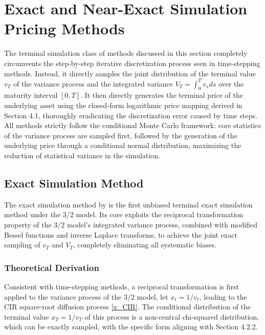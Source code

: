 \section{Exact and Near-Exact Simulation Pricing Methods}
The terminal simulation class of methods discussed in this section completely circumvents the step-by-step iterative discretization process seen in time-stepping methods. Instead, it directly samples the joint distribution of the terminal value $v_T$ of the variance process and the integrated variance $V_T = \int_0^T v_s ds$ over the maturity interval $[0,T]$. It then directly generates the terminal price of the underlying asset using the closed-form logarithmic price mapping derived in Section 4.1, thoroughly eradicating the discretization error caused by time steps. All methods strictly follow the conditional Monte Carlo framework: core statistics of the variance process are sampled first, followed by the generation of the underlying price through a conditional normal distribution, maximizing the reduction of statistical variance in the simulation.

\subsection{Exact Simulation Method}

The exact simulation method by \citet{baldeauxEXACTSIMULATION322012} is the first unbiased terminal exact simulation method under the $3/2$ model. Its core exploits the reciprocal transformation property of the $3/2$ model's integrated variance process, combined with modified Bessel functions and inverse Laplace transforms, to achieve the joint exact sampling of $v_T$ and $V_T$, completely eliminating all systematic biases.

\subsubsection{Theoretical Derivation}
Consistent with time-stepping methods, a reciprocal transformation is first applied to the variance process of the $3/2$ model, let $x_t = 1/v_t$, leading to the CIR square-root diffusion process \eqref{x_CIR}. The conditional distribution of the terminal value $x_T = 1/v_T$ of this process is a non-central chi-squared distribution, which can be exactly sampled, with the specific form aligning with Section 4.2.2.

